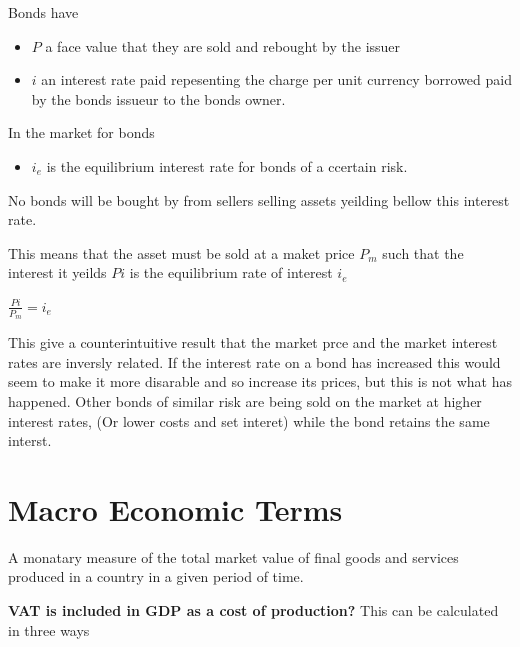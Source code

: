 \documentclass{tufte-book}
\providecommand{\tightlist}{%
  \setlength{\itemsep}{0pt}\setlength{\parskip}{0pt}}
\begin{document}
Bonds have

\begin{itemize}
\tightlist
\item
  \(P\) a face value that they are sold and rebought by the issuer
\item
  \(i\) an interest rate paid repesenting the charge per unit currency
  borrowed paid by the bonds issueur to the bonds owner.
\end{itemize}

In the market for bonds

\begin{itemize}
\tightlist
\item
  \(i_e\) is the equilibrium interest rate for bonds of a ccertain risk.
\end{itemize}

No bonds will be bought by from sellers selling assets yeilding bellow
this interest rate.

This means that the asset must be sold at a maket price \(P_m\) such
that the interest it yeilds \(Pi\) is the equilibrium rate of interest
\(i_e\)

\(\frac{Pi}{P_m} = i_e\)

This give a counterintuitive result that the market prce and the market
interest rates are inversly related. If the interest rate on a bond has
increased this would seem to make it more disarable and so increase its
prices, but this is not what has happened. Other bonds of similar risk
are being sold on the market at higher interest rates, (Or lower costs
and set interet) while the bond retains the same interst.\hypertarget{macro-economic-terms}{%
\section{Macro Economic Terms}\label{macro-economic-terms}}

\begin{description}
\tightlist
\item[GDP]
A monatary measure of the total market value of final goods and services
produced in a country in a given period of time.
\end{description}

\textbf{VAT is included in GDP as a cost of production?} This can be
calculated in three ways
\end{document}
